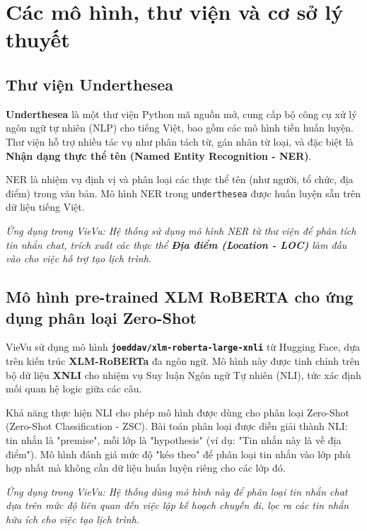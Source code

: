 \section{Các mô hình, thư viện và cơ sở lý thuyết}
\label{sec:fundamental_knowledge}
\subsection{Thư viện Underthesea}

\textbf{Underthesea} \cite{underthesea_lib} là một thư viện Python mã nguồn mở, cung cấp bộ công cụ xử lý ngôn ngữ tự nhiên (NLP) cho tiếng Việt, bao gồm các mô hình tiền huấn luyện. Thư viện hỗ trợ nhiều tác vụ như phân tách từ, gán nhãn từ loại, và đặc biệt là \textbf{Nhận dạng thực thể tên (Named Entity Recognition - NER)}.

NER là nhiệm vụ định vị và phân loại các thực thể tên (như người, tổ chức, địa điểm) trong văn bản. Mô hình NER trong \texttt{underthesea} được huấn luyện sẵn trên dữ liệu tiếng Việt.

\textit{Ứng dụng trong VieVu: Hệ thống sử dụng mô hình NER từ thư viện để phân tích tin nhắn chat, trích xuất các thực thể \textbf{Địa điểm (Location - LOC)} làm đầu vào cho việc hỗ trợ tạo lịch trình.}

\subsection{Mô hình pre-trained XLM RoBERTA cho ứng dụng phân loại Zero-Shot}

VieVu sử dụng mô hình \textbf{\texttt{joeddav/xlm-roberta-large-xnli}} \cite{xlm_roberta_xnli_model} từ Hugging Face, dựa trên kiến trúc \textbf{XLM-RoBERTa} \cite{xlm_roberta_paper} đa ngôn ngữ. Mô hình này được tinh chỉnh trên bộ dữ liệu \textbf{XNLI} cho nhiệm vụ Suy luận Ngôn ngữ Tự nhiên (NLI), tức xác định mối quan hệ logic giữa các câu.

Khả năng thực hiện NLI cho phép mô hình được dùng cho phân loại Zero-Shot (Zero-Shot Classification - ZSC). Bài toán phân loại được diễn giải thành NLI: tin nhắn là "premise", mỗi lớp là "hypothesis" (ví dụ: "Tin nhắn này là về địa điểm"). Mô hình đánh giá mức độ "kéo theo" để phân loại tin nhắn vào lớp phù hợp nhất mà không cần dữ liệu huấn luyện riêng cho các lớp đó.

\textit{Ứng dụng trong VieVu: Hệ thống dùng mô hình này để phân loại tin nhắn chat dựa trên mức độ liên quan đến việc lập kế hoạch chuyến đi, lọc ra các tin nhắn hữu ích cho việc tạo lịch trình.}

